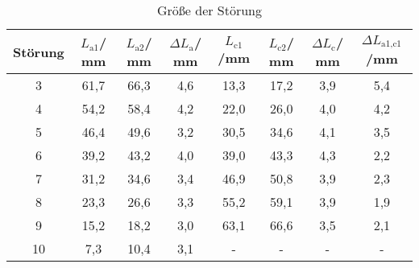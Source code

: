 \begin{table}[h!]
  \centering
  \caption{Größe der Störung}
  \label{tab:bscan}
  \begin{tabular}{c c c c c c c c}
    \toprule
      Störung & $L_{\text{a1}}$/ mm & $L_{\text{a2}}$/ mm & $\Delta L_{\text{a}}$/ mm & $L_{\text{c1}}$/mm & $L_{\text{c2}}$/ mm & $\Delta L_{\text{c}}$/ mm & $\Delta L_{\text{a1,c1}}$/mm\\
    \midrule
3  & 61,7 & 66,3 & 4,6  & 13,3 & 17,2 & 3,9 & 5,4\\
4  & 54,2 & 58,4 & 4,2  & 22,0 & 26,0 & 4,0 & 4,2\\
5  & 46,4 & 49,6 & 3,2  & 30,5 & 34,6 & 4,1 & 3,5\\
6  & 39,2 & 43,2 & 4,0  & 39,0 & 43,3 & 4,3 & 2,2\\
7  & 31,2 & 34,6 & 3,4  & 46,9 & 50,8 & 3,9 & 2,3\\
8  & 23,3 & 26,6 & 3,3  & 55,2 & 59,1 & 3,9 & 1,9\\
9  & 15,2 & 18,2 & 3,0  & 63,1 & 66,6 & 3,5 & 2,1\\
10 &  7,3 & 10,4 & 3,1 & -    & -    & -   & -  \\
    \bottomrule
  \end{tabular}
\end{table}
